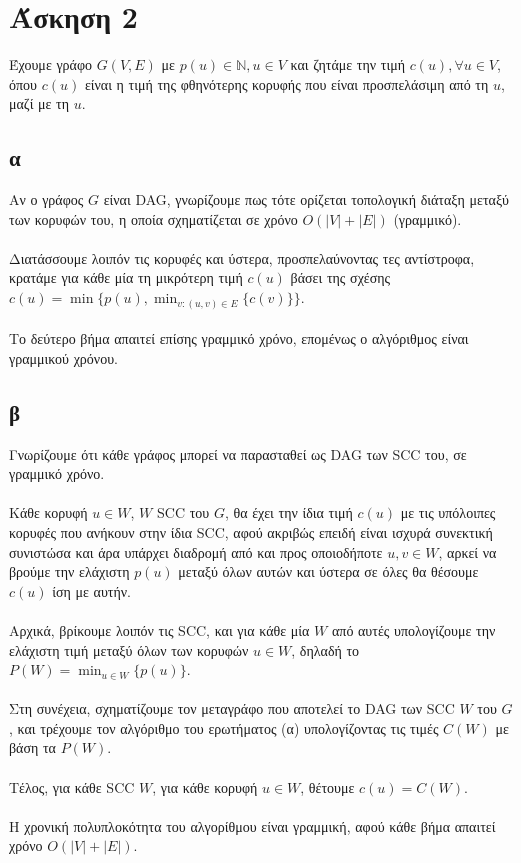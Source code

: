 \documentclass[12pt,a4paper]{article}
\begin{document}
  \section{Άσκηση 2}

  Έχουμε γράφο \( G(V, E) \) με \( p(u) \in \mathbb{N}, u \in V \) και ζητάμε 
  την τιμή  \( c(u), \forall u \in V \), όπου \( c(u) \) είναι η τιμή της 
  φθηνότερης κορυφής που είναι προσπελάσιμη από τη \( u \), μαζί με τη \( u \).

  \subsection{α}

  Aν ο γράφος \( G \) είναι {\latintext DAG}, γνωρίζουμε πως τότε ορίζεται
  τοπολογική διάταξη μεταξύ των κορυφών του, η οποία σχηματίζεται σε χρόνο
  \( Ο(|V| + |E|) \) (γραμμικό).
  \\
  \\
  Διατάσσουμε λοιπόν τις κορυφές και ύστερα,
  προσπελαύνοντας τες αντίστροφα, κρατάμε για κάθε μία τη μικρότερη τιμή
  \( c(u) \) βάσει της σχέσης \( c(u) = \min\{ p(u), \min_{ v : (u, v) \in E}
  \{c(v)\}\} \).
  \\
  \\
  Το δεύτερο βήμα απαιτεί επίσης γραμμικό χρόνο, επομένως ο αλγόριθμος είναι
  γραμμικού χρόνου.

  \subsection{β}

  Γνωρίζουμε ότι κάθε γράφος μπορεί να παρασταθεί ως {\latintext DAG} των 
  {\latintext SCC} του, σε γραμμικό χρόνο.
  \\
  \\
  Κάθε κορυφή \( u \in W \), \( W \) {\latintext SCC} του \( G \),
  θα έχει την ίδια τιμή \( c(u) \) με τις υπόλοιπες κορυφές που
  ανήκουν στην ίδια {\latintext SCC}, αφού ακριβώς επειδή είναι ισχυρά συνεκτική
  συνιστώσα και άρα υπάρχει διαδρομή από και προς οποιοδήποτε
  \( u, v \in W \), αρκεί να
  βρούμε την ελάχιστη \( p(u) \) μεταξύ όλων αυτών και ύστερα σε όλες θα θέσουμε
  \( c(u) \) ίση με αυτήν.
  \\
  \\
  Αρχικά, βρίκουμε λοιπόν τις {\latintext SCC}, και για κάθε μία \( W \) από
  αυτές υπολογίζουμε την ελάχιστη τιμή μεταξύ όλων των κορυφών \( u \in W \),
  δηλαδή το \( P(W) = \min_{u \in W}\{ p(u) \}\).
  \\
  \\
  Στη συνέχεια, σχηματίζουμε τον μεταγράφο που αποτελεί το {\latintext DAG} των 
  {\latintext SCC \( W \)} του \( G \), και τρέχουμε τον αλγόριθμο του
  ερωτήματος (α) υπολογίζοντας τις τιμές \( C(W) \) με βάση τα \( P(W) \).
  \\
  \\
  Tέλος, για κάθε {\latintext SCC \(W\)}, για κάθε κορυφή \(u \in W \), θέτουμε
  \( c(u) = C(W) \).
  \\
  \\
  Η χρονική πολυπλοκότητα του αλγορίθμου είναι γραμμική, αφού κάθε βήμα απαιτεί
  χρόνο \( Ο(|V| + |E|) \).
\end{document}
